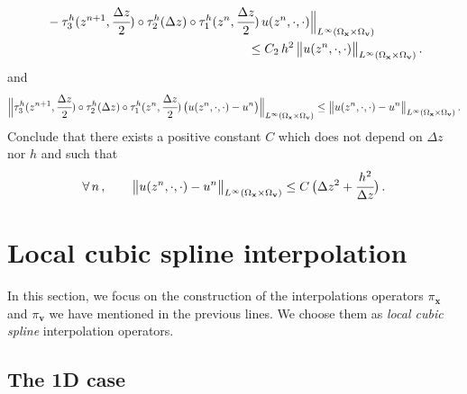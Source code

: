 \documentclass[10pt]{article}
\begin{document}
\begin{leftbar}
\begin{equation}
\begin{split}
&- \tau_{3}^{h}(z^{n+1},\cfrac{\Delta z}{2}) \circ \tau_{2}^{h}(\Delta z) \circ \tau_{1}^{h}(z^{n},\cfrac{\Delta z}{2}) \, u(z^{n},\cdot,\cdot) \Big\|_{L^{\infty}(\Omega_{\mathbf{x}} \times \Omega_{\mathbf{v}})} \\
&\qquad \qquad \qquad \qquad \qquad \qquad \qquad \qquad \leq C_{2}\, h^{2} \, \big\|u(z^{n},\cdot,\cdot) \big\|_{L^{\infty}(\Omega_{\mathbf{x}} \times \Omega_{\mathbf{v}})} \, .
\end{split}
\end{equation}
and
\begin{equation}
\Big\|\tau_{3}^{h}(z^{n+1},\cfrac{\Delta z}{2}) \circ \tau_{2}^{h}(\Delta z) \circ \tau_{1}^{h}(z^{n},\cfrac{\Delta z}{2}) \, \big(u(z^{n},\cdot,\cdot)-u^{n}\big) \Big\|_{L^{\infty}(\Omega_{\mathbf{x}} \times \Omega_{\mathbf{v}})} \leq \big\|u(z^{n},\cdot,\cdot)-u^{n}\big\|_{L^{\infty}(\Omega_{\mathbf{x}} \times \Omega_{\mathbf{v}})} \, .
\end{equation}
Conclude that there exists a positive constant $C$ which does not depend on $\Delta z$ nor $h$ and such that
\begin{equation}
\forall\, n\, , \qquad \big\|u(z^{n},\cdot,\cdot)-u^{n}\big\|_{L^{\infty}(\Omega_{\mathbf{x}} \times \Omega_{\mathbf{v}})} \leq C \, \big( \Delta z^{2} + \cfrac{h^{2}}{\Delta z}\big) \, .
\end{equation}
\end{leftbar}



\section{Local cubic spline interpolation}
\setcounter{equation}{0}

In this section, we focus on the construction of the interpolations operators $\pi_{\mathbf{x}}$ and $\pi_{\mathbf{v}}$ we have mentioned in the previous lines. We choose them as \textit{local cubic spline} interpolation operators.

\subsection{The 1D case}
\end{document}
